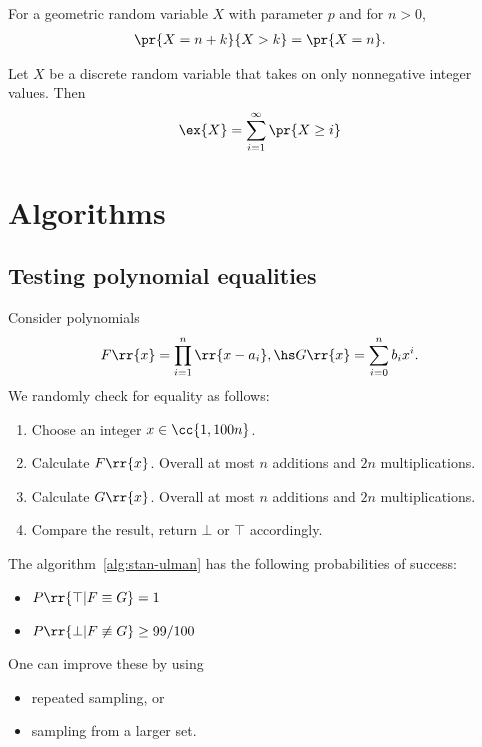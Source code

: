 \documentclass{article}
\begin{document}
\begin{lemma}
	For a geometric random variable $X$ with parameter $p$ and for $n>0$,
	\begin{align*}
		\pr{X=n+k}{X>k} = \pr{X=n}.
	\end{align*}
\end{lemma}

\begin{lemma}
	Let $X$ be a discrete random variable that takes on only nonnegative integer values. Then
	\begin{align*}
		\ex{X} = \sum_{i=1}^{\infty} \pr{X\geq i}
	\end{align*}
\end{lemma}

\section{Algorithms}
\label{sec:algorithms}

\subsection{Testing polynomial equalities}

\begin{algorithm}
	\label{alg:stan-ulam}
	Consider polynomials
	\begin{align*}
		F \rr{ x } = \prod_{i=1}^n \rr{ x - a_i }, \hs G \rr{ x } = \sum_{ i=0 }^{ n } b_i x^i.
	\end{align*}
	We randomly check for equality as follows:
	\begin{enumerate}
		\item Choose an integer $x\in \cc{ 1, 100n }$.
		\item Calculate $F \rr{ x }$. Overall at most $n$ additions and $2n$ multiplications.
		\item Calculate $G \rr{ x }$. Overall at most $n$ additions and $2n$ multiplications.
		\item Compare the result, return $\bot$ or $\top$ accordingly.
	\end{enumerate}
\end{algorithm}


\begin{theorem}
	\label{thm:stan-ulman-probabilities}
	The algorithm~\ref{alg:stan-ulman} has the following probabilities of success:
	\begin{itemize}
		\item $P \rr{ \top | F\equiv G } = 1$
		\item $P \rr{ \bot | F\not\equiv G } \geq 99/100$
	\end{itemize}
	One can improve these by using
	\begin{itemize}
		\item repeated sampling, or
		\item sampling from a larger set.
	\end{itemize}
\end{theorem}
\end{document}
